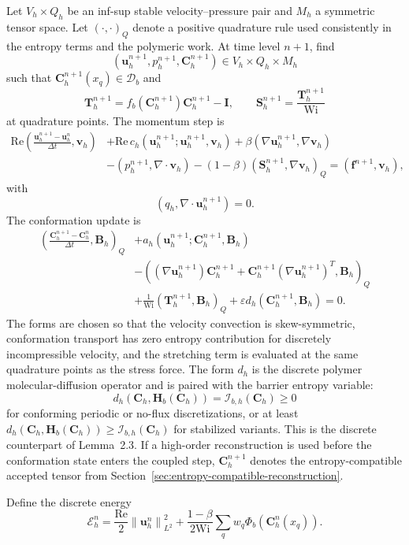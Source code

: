 ﻿\documentclass[11pt]{amsart}
\newcommand{\CC}{\bm C}
\newcommand{\BB}{\bm B}
\newcommand{\EE}{\mathcal E}
\newcommand{\HH}{\bm H}
\newcommand{\Id}{\bm I}
\newcommand{\SSS}{\bm S}
\newcommand{\TT}{\bm T}
\newcommand{\uu}{\bm u}
\newcommand{\vv}{\bm v}
\newcommand{\Wi}{\mathrm{Wi}}
\newcommand{\Rey}{\mathrm{Re}}
\newcommand{\dt}{\Delta t}
\newcommand{\calD}{\mathcal D}
\newcommand{\divv}{\nabla\!\cdot}
\newcommand{\grad}{\nabla}
\newcommand{\norm}[1]{\left\|#1\right\|}
\begin{document}
Let $V_h\times Q_h$ be an inf-sup stable velocity--pressure pair and $M_h$ a symmetric tensor space.  Let $(\cdot,\cdot)_Q$ denote a positive quadrature rule used consistently in the entropy terms and the polymeric work.  At time level $n+1$, find
\[
  (\uu_h^{n+1},p_h^{n+1},\CC_h^{n+1})\in V_h\times Q_h\times M_h
\]
such that $\CC_h^{n+1}(x_q)\in\calD_b$ and
\[
  \TT_h^{n+1}=f_b(\CC_h^{n+1})\CC_h^{n+1}-\Id,\qquad
  \SSS_h^{n+1}=\frac{\TT_h^{n+1}}{\Wi}
\]
at quadrature points.  The momentum step is
\[
\begin{aligned}
  \Rey\left(\frac{\uu_h^{n+1}-\uu_h^n}{\dt},\vv_h\right)
  &+\Rey\,c_h(\uu_h^{n+1};\uu_h^{n+1},\vv_h)
  +\beta(\grad\uu_h^{n+1},\grad\vv_h)\\
  &-(p_h^{n+1},\divv\vv_h)
  -(1-\beta)(\SSS_h^{n+1},\grad\vv_h)_Q
  =
  (\bm f^{n+1},\vv_h),
\end{aligned}
\label{eq:scheme-mom}
\]
with
\[
  (q_h,\divv\uu_h^{n+1})=0.
  \label{eq:scheme-div}
\]
The conformation update is
\[
\begin{aligned}
  \left(\frac{\CC_h^{n+1}-\CC_h^n}{\dt},\BB_h\right)_Q
  &+a_h(\uu_h^{n+1};\CC_h^{n+1},\BB_h)\\
  &-\left((\grad\uu_h^{n+1})\CC_h^{n+1}
  +\CC_h^{n+1}(\grad\uu_h^{n+1})^T,\BB_h\right)_Q\\
  &+\frac1{\Wi}(\TT_h^{n+1},\BB_h)_Q
  +\varepsilon d_h(\CC_h^{n+1},\BB_h)=0 .
\end{aligned}
\label{eq:scheme-conf}
\]
The forms are chosen so that the velocity convection is skew-symmetric, conformation transport has zero entropy contribution for discretely incompressible velocity, and the stretching term is evaluated at the same quadrature points as the stress force.  The form $d_h$ is the discrete polymer molecular-diffusion operator and is paired with the barrier entropy variable:
\[
  d_h(\CC_h,\HH_b(\CC_h))=\mathcal I_{b,h}(\CC_h)\ge0
\]
for conforming periodic or no-flux discretizations, or at least $d_h(\CC_h,\HH_b(\CC_h))\ge \mathcal I_{b,h}(\CC_h)$ for stabilized variants.  This is the discrete counterpart of Lemma~2.3.  If a high-order reconstruction is used before the conformation state enters the coupled step, $\CC_h^{n+1}$ denotes the entropy-compatible accepted tensor from Section~\ref{sec:entropy-compatible-reconstruction}.

Define the discrete energy
\[
  \EE_h^n
  =
  \frac{\Rey}{2}\norm{\uu_h^n}_{L^2}^2
  +
  \frac{1-\beta}{2\Wi}
  \sum_q w_q\Phi_b(\CC_h^n(x_q)).
\]
\end{document}
